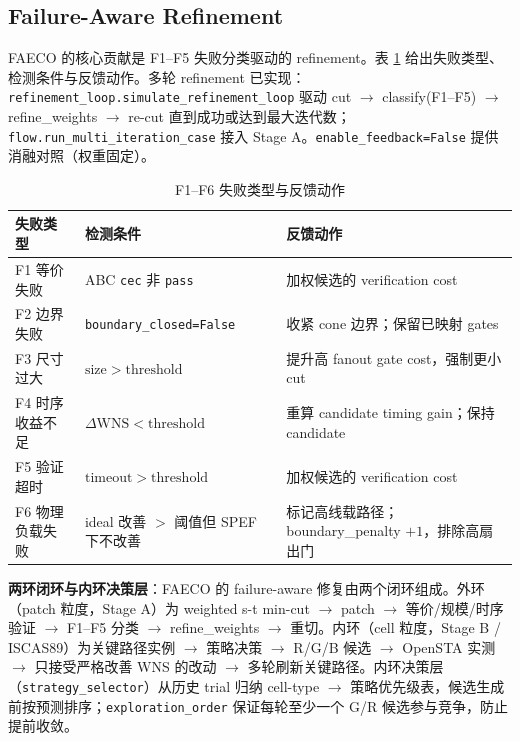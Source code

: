 \documentclass[journal]{IEEEtran}
\begin{document}
\subsection{Failure-Aware Refinement}

FAECO 的核心贡献是 F1--F5 失败分类驱动的 refinement。表 \ref{tab:failures} 给出失败类型、检测条件与反馈动作。多轮 refinement 已实现：\texttt{refinement\_loop.simulate\_refinement\_loop} 驱动 cut $\rightarrow$ classify(F1--F5) $\rightarrow$ refine\_weights $\rightarrow$ re-cut 直到成功或达到最大迭代数；\texttt{flow.run\_multi\_iteration\_case} 接入 Stage A。\texttt{enable\_feedback=False} 提供消融对照（权重固定）。

\begin{table}[!t]
\centering
\caption{F1--F6 失败类型与反馈动作}
\label{tab:failures}
\scriptsize
\setlength{\tabcolsep}{3pt}
\begin{tabular}{lll}
\toprule
\textbf{失败类型} & \textbf{检测条件} & \textbf{反馈动作} \\
\midrule
F1 等价失败 & ABC \texttt{cec} 非 \texttt{pass} & 加权候选的 verification cost \\
F2 边界失败 & \texttt{boundary\_closed=False} & 收紧 cone 边界；保留已映射 gates \\
F3 尺寸过大 & $\mathrm{size} > \mathrm{threshold}$ & 提升高 fanout gate cost，强制更小 cut \\
F4 时序收益不足 & $\Delta\mathrm{WNS} < \mathrm{threshold}$ & 重算 candidate timing gain；保持 candidate \\
F5 验证超时 & $\mathrm{timeout} > \mathrm{threshold}$ & 加权候选的 verification cost \\
F6 物理负载失败 & ideal 改善 $>$ 阈值但 SPEF 下不改善 & 标记高线载路径；boundary\_penalty $+1$，排除高扇出门 \\
\bottomrule
\end{tabular}
\end{table}

\textbf{两环闭环与内环决策层}：FAECO 的 failure-aware 修复由两个闭环组成。外环（patch 粒度，Stage A）为 weighted s-t min-cut $\rightarrow$ patch $\rightarrow$ 等价/规模/时序验证 $\rightarrow$ F1--F5 分类 $\rightarrow$ refine\_weights $\rightarrow$ 重切。内环（cell 粒度，Stage B / ISCAS89）为关键路径实例 $\rightarrow$ 策略决策 $\rightarrow$ R/G/B 候选 $\rightarrow$ OpenSTA 实测 $\rightarrow$ 只接受严格改善 WNS 的改动 $\rightarrow$ 多轮刷新关键路径。内环决策层（\texttt{strategy\_selector}）从历史 trial 归纳 cell-type $\rightarrow$ 策略优先级表，候选生成前按预测排序；\texttt{exploration\_order} 保证每轮至少一个 G/R 候选参与竞争，防止提前收敛。
\end{document}
